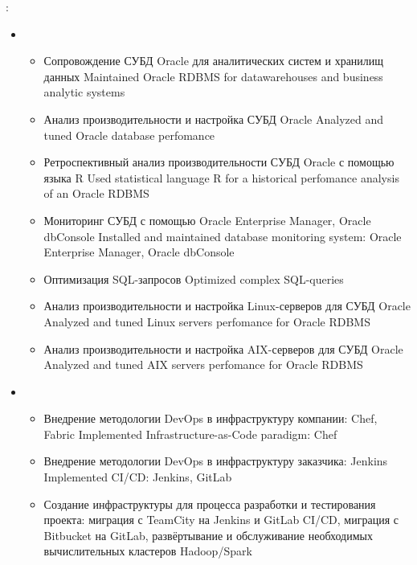 \documentclass[11pt,a4paper,sans, russian]{moderncv}        %
\begin{document}
{\protect{}}
{}
{}
{
	\achievements:
	\begin{itemize}
		\item {}
		\begin{itemize}
			\item {}
				{Сопровождение СУБД Oracle для аналитических систем и хранилищ данных}
				{Maintained Oracle RDBMS for datawarehouses and business analytic systems}
			\item {}
				{Анализ производительности и настройка СУБД Oracle}
				{Analyzed and tuned Oracle database perfomance}
			\item {}
				{Ретроспективный анализ производительности СУБД Oracle с помощью языка R}
				{Used statistical language R for a historical perfomance analysis of an Oracle RDBMS}
			\item {}
				{Мониторинг СУБД с помощью Oracle Enterprise Manager, Oracle dbConsole}
				{Installed and maintained database monitoring system: Oracle Enterprise Manager, Oracle dbConsole}
			\item {}
				{Оптимизация SQL-запросов}
				{Optimized complex SQL-queries}
			\item {}
				{Анализ производительности и настройка Linux-серверов для СУБД Oracle}
				{Analyzed and tuned Linux servers perfomance for Oracle RDBMS}
			\item {}
				{Анализ производительности и настройка AIX-серверов для СУБД Oracle}
				{Analyzed and tuned AIX servers perfomance for Oracle RDBMS}
		\end{itemize}
		\item {}
		\begin{itemize}
			\item {}
				{Внедрение методологии DevOps в инфраструктуру компании: Chef, Fabric}
				{Implemented Infrastructure-as-Code paradigm: Chef}
			\item {}
				{Внедрение методологии DevOps в инфраструктуру заказчика: Jenkins}
				{Implemented CI/CD: Jenkins, GitLab}
			\item {}
				{Создание инфраструктуры для процесса разработки и тестирования проекта: миграция с TeamCity на Jenkins и GitLab CI/CD, миграция с Bitbucket на GitLab, развёртывание и обслуживание необходимых вычислительных кластеров Hadoop/Spark}

\end{itemize}
\end{itemize}}
\end{document}
